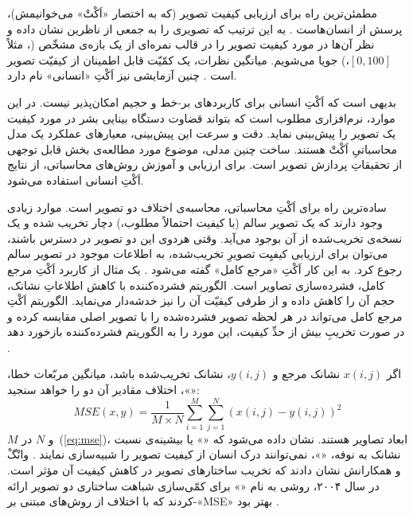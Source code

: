 \documentclass[twocolumn]{article}
\begin{document}
مطمئن‌ترین راه برای ارزیابی کیفیت تصویر (که به اختصار «اَکْتْ» می‌خوانیمش)، پرسش از انسان‌هاست \cite{allen2012manual}. به این ترتیب که تصویری را به جمعی از ناظرین نشان داده و نظر آن‌ها در مورد کیفیت تصویر را در قالب نمره‌ای از یک بازه‌ی مشخّص (، مثلاً $[0, 100]$،) جویا می‌شویم. میانگین نظرات، یک کمّیّت قابل اطمینان از کیفیّت تصویر است \cite{mohammadi2014subjective}. چنین آزمایشی نیز اَکْتِ «انسانی» نام دارد.

بدیهی است که اَکْتِ انسانی برای کاربردهای بر-خط و حجیم امکان‌پذیر نیست. در این موارد، نرم‌افزاری مطلوب است که بتواند قضاوت دستگاه بینایی بشر در مورد کیفیت یک تصویر را پیش‌بینی نماید. دقت و سرعت این پیش‌بینی، معیارهای عملکرد یک مدل محاسباتیِ اَکْتْ هستند. ساخت چنین مدلی، موضوع مورد مطالعه‌ی بخش قابل توجهی از تحقیقاتِ پردازش تصویر است\cite{zhai2020perceptual}. برای ارزیابی و آموزش روش‌های محاسباتی، از نتایج اَکْتِ انسانی استفاده می‌شود.

ساده‌ترین راه برای اَکْتِ محاسباتی، محاسبه‌ی اختلاف دو تصویر است. موارد زیادی وجود دارند که یک تصویر سالم (با کیفیت احتمالاً مطلوب،) دچار تخریب شده و یک نسخه‌ی تخریب‌شده از آن بوجود می‌آید. وقتی هردوی این دو تصویر در دسترس باشند، می‌توان برای ارزیابی کیفیِت تصویرِ تخریب‌شده، به اطلاعات موجود در تصویر سالم رجوع کرد. به این کار اَکْتِ «مرجع کامل» گفته می‌شود \cite{larson2010most}. یک مثال از کاربرد اَکْتِ مرجع کامل، فشرده‌سازی تصاویر است. الگوریتم فشرده‌کننده با کاهش اطلاعاتِ نشانک، حجم آن را کاهش داده و از طرفی کیفیّت آن را نیز خدشه‌دار می‌نماید. الگوریتم اَکْتِ مرجع کامل می‌تواند در هر لحظه تصویر فشرده‌شده را با تصویر اصلی مقایسه کرده و در صورت تخریبِ بیش از حدِّ کیفیت، این مورد را به الگوریتم فشرده‌کننده بازخورد دهد \cite{eckert1998perceptual}.

اگر $x(i, j)$ نشانک مرجع و $y(i, j)$، نشانک تخریب‌شده باشد، میانگین مربّعات خطا، «»، اختلاف مقادیر آن دو را خواهد سنجید:
\begin{equation}
	MSE(x, y) = \displaystyle \frac{1}{M\times N} \sum_{i=1}^M\sum_{j=1}^N (x(i, j)- y(i, j))^2
\label{eq:mse}
\end{equation}
$M$ و $N$ در~(\ref{eq:mse})، ابعاد تصاویر هستند. 
نشان داده می‌شود که «» یا بیشینه‌ی نسبت نشانک به نوفه، «»، نمی‌توانند درک انسان از کیفیت تصویر را شبیه‌سازی نمایند \cite{wang2009mean}. وانْگْ و همکارانش نشان دادند که تخریب ساختارهای تصویر در کاهش کیفیت آن مؤثر است\cite{wang2009mean}. در سال ۲۰۰۴، روشی به نام «» برای کمّی‌سازی شباهت ساختاری دو تصویر ارائه کردند \cite{wang2004image} که با اختلاف از روش‌های مبتنی بر-«MSE» بهتر بود \cite{sheikh2006statistical}.  
\end{document}
